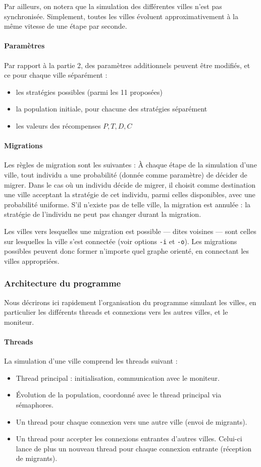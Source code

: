 \documentclass[10pt]{article}
\begin{document}
Par ailleurs, on notera que la simulation des différentes villes n'est pas synchronisée. 
Simplement, toutes les villes évoluent approximativement à la même vitesse de une étape par seconde.

\paragraph{Paramètres}
Par rapport à la partie 2, des paramètres additionnels peuvent être modifiés, et ce pour chaque ville séparément :
\begin{itemize}
\item les stratégies possibles (parmi les 11 proposées)
\item la population initiale, pour chacune des stratégies séparément
\item les valeurs des récompenses $P,T,D,C$
\end{itemize}

\paragraph{Migrations}
Les règles de migration sont les suivantes :
À chaque étape de la simulation d'une ville, tout individu a une probabilité (donnée comme paramètre) de décider de migrer.
Dans le cas où un individu décide de migrer, il choisit comme destination une ville acceptant la stratégie de cet individu, parmi celles disponibles,
avec une probabilité uniforme. S'il n'existe pas de telle ville, la migration est annulée : la stratégie de l'individu ne peut pas changer durant la migration.

Les villes vers lesquelles une migration est possible --- dites voisines --- sont celles sur lesquelles la ville s'est connectée
(voir options \verb|-i| et \verb|-o|). Les migrations possibles peuvent donc former n'importe quel graphe orienté, en connectant
les villes appropriées.

\subsubsection{Architecture du programme}
Nous décrirons ici rapidement l'organisation du programme simulant les villes,
en particulier les différents threads et connexions vers les autres villes, et le moniteur.

\paragraph{Threads}
La simulation d'une ville comprend les threads suivant :
\begin{itemize}
\item Thread principal : initialisation, communication avec le moniteur.
\item Évolution de la population, coordonné avec le thread principal via sémaphores.
\item Un thread pour chaque connexion vers une autre ville (envoi de migrants).
\item Un thread pour accepter les connexions entrantes d'autres villes.
      Celui-ci lance de plus un nouveau thread pour chaque connexion entrante (réception de migrants).
\end{itemize}
\end{document}
